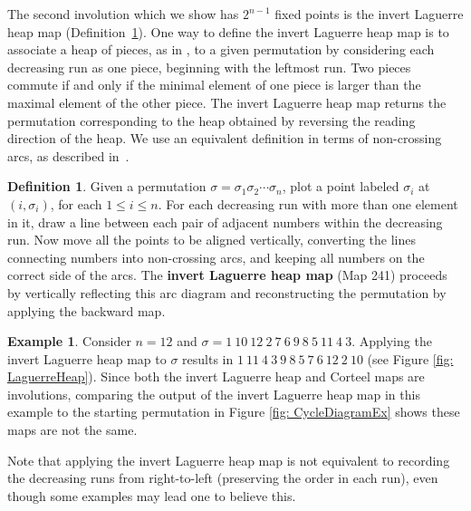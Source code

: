\documentclass{amsart}
\theoremstyle{definition}
\newtheorem{definition}[thm]{Definition}
\newtheorem{example}[thm]{Example}
\begin{document}
The second involution which we show has $2^{n-1}$ fixed points is the invert Laguerre heap map (Definition~\ref{def: LaguerreHeap}). One way to define the invert Laguerre heap map is to associate a heap of pieces, as in \cite{Viennot_heaps}, to a given permutation by considering each decreasing run as one piece, beginning with the leftmost run. Two pieces commute if and only if the minimal element of one piece is larger than the maximal element of the other piece.  The invert Laguerre heap map returns the permutation corresponding to the heap obtained by reversing the reading direction of the heap. We use an equivalent definition in terms of non-crossing arcs, as described  in~\cite{reading2015noncrossing}.

\begin{definition}\label{def: LaguerreHeap}
  Given a permutation $\sigma=\sigma_1\sigma_2\cdots\sigma_n$,
  plot a point labeled $\sigma_i$ at $(i,\sigma_i)$, for each $1\leq i\leq n$. For each decreasing run with more than one element in it, draw a line between each pair of adjacent numbers within the decreasing run. Now move all the points to be aligned vertically, converting the lines connecting numbers into non-crossing arcs, and keeping all numbers on the correct side of the arcs. The \textbf{invert Laguerre heap map} (Map 241) proceeds by vertically reflecting this arc diagram and reconstructing the permutation by applying the backward map.
\end{definition}



\begin{example}
  Consider $n = 12$ and $\sigma=1~10~12~2~7~6~9~8~5~11~4~3$. 
  Applying the invert Laguerre heap map to $\sigma$ results in $1~11~4~3~9~8~5~7~6~12~2~10$ (see Figure \ref{fig: LaguerreHeap}). Since both the invert Laguerre heap and Corteel maps are involutions, comparing the output of the invert Laguerre heap map in this example to the starting permutation in Figure \ref{fig: CycleDiagramEx} shows these maps are not the same.

  Note that  applying the invert Laguerre heap map is not equivalent to recording the decreasing runs from right-to-left (preserving the order in each run), even though some examples may lead one to believe this.
\end{example}
\end{document}
